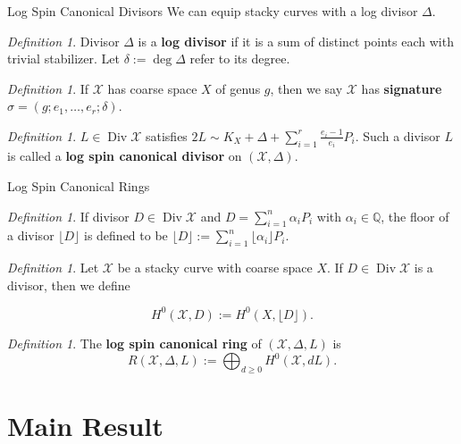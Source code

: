 \documentclass{beamer}
\theoremstyle{remark}
\newtheorem{defn}[thm]{Definition}
\newcommand\BQ{{\mathbb Q}}
\newcommand \sx{{\mathscr X}}
\DeclareMathOperator\di{Div}
\newcommand{\halfcan}{L}
\begin{document}

\begin{frame}{Log Spin Canonical Divisors}
We can equip stacky curves with a log divisor $\Delta$.

\begin{defn}
Divisor $\Delta$ is a \textbf{log divisor} if it is a sum of distinct
points each with trivial stabilizer. Let $\delta := \deg \Delta$
refer to its degree.
\end{defn}


\begin{defn}
If $\sx$ has coarse space $X$ of genus $g$, then we say $\sx$ has
\textbf{signature} $\sigma = (g; e_1, \ldots, e_r; \delta)$.
\end{defn}


\begin{defn}
$\halfcan \in \di
\sx$ satisfies $2 \halfcan \sim K_X + \Delta + \sum_{i = 1}^{r}
\frac{e_i - 1}{e_i} P_i$. Such a divisor $\halfcan$ is called a
\textbf{log spin canonical divisor} on $(\sx, \Delta)$.
\end{defn}

\end{frame}


\begin{frame}{Log Spin Canonical Rings}

\begin{defn}
If divisor $D \in \di \sx$ and $D = \sum_{i = 1}^{n} \alpha_i P_i$
with $\alpha_i \in \BQ$, the floor of a divisor $\lfloor D
\rfloor$ is defined to be $\lfloor D \rfloor := \sum_{i = 1}^{n}
\lfloor \alpha_i \rfloor P_i$.
\end{defn}

\begin{defn}
Let $\sx$ be a stacky curve with coarse space $X$.
If $D \in \di \sx$ is a divisor, then we define

\[
	H^0(\sx, D) := H^0(X, \lfloor D \rfloor).
\]
\end{defn}

\begin{defn}
The {\bf log spin canonical ring} of $(\sx, \Delta, \halfcan)$ is
\[
	R(\sx, \Delta, \halfcan) := \bigoplus_{d \geq 0} H^0(\sx, d \halfcan).
\]
\end{defn}

\end{frame}

\section{Main Result}
\end{document}
